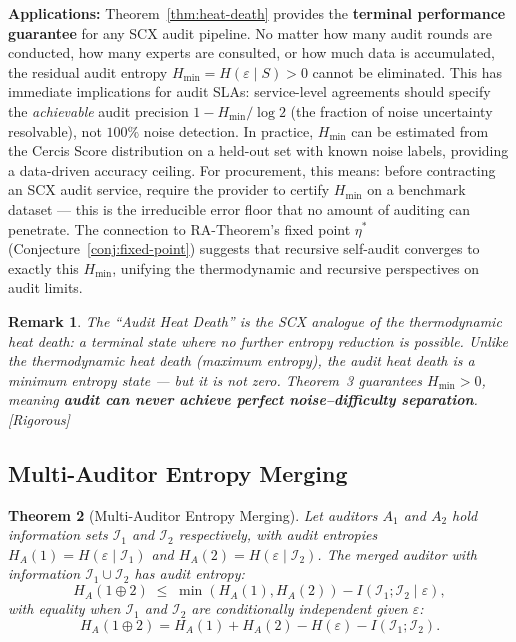 \documentclass[12pt,a4paper]{article}
\newtheorem{theorem}{Theorem}[section]
\newtheorem{remark}[theorem]{Remark}
\newcommand{\rigorous}{\textcolor{green!50!black}{\small\textsf{[Rigorous]}}}
\newcommand{\cI}{\mathcal{I}}
\begin{document}
\medskip\noindent
\textbf{Applications:}
Theorem~\ref{thm:heat-death} provides the \textbf{terminal performance
guarantee} for any SCX audit pipeline.  No matter how many audit rounds are
conducted, how many experts are consulted, or how much data is accumulated,
the residual audit entropy $H_{\min}=H(\varepsilon\mid S)>0$ cannot be
eliminated.  This has immediate implications for audit SLAs: service-level
agreements should specify the \emph{achievable} audit precision
$1-H_{\min}/\log 2$ (the fraction of noise uncertainty resolvable), not
$100\%$ noise detection.  In practice, $H_{\min}$ can be estimated from
the Cercis Score distribution on a held-out set with known noise labels,
providing a data-driven accuracy ceiling.  For procurement, this means:
before contracting an SCX audit service, require the provider to certify
$H_{\min}$ on a benchmark dataset — this is the irreducible error floor that
no amount of auditing can penetrate.  The connection to RA-Theorem's fixed
point $\eta^*$ (Conjecture~\ref{conj:fixed-point}) suggests that recursive
self-audit converges to exactly this $H_{\min}$, unifying the thermodynamic
and recursive perspectives on audit limits.

\begin{remark}
The ``Audit Heat Death'' is the SCX analogue of the thermodynamic heat death:
a terminal state where no further entropy reduction is possible.  Unlike the
thermodynamic heat death (maximum entropy), the audit heat death is a
\emph{minimum} entropy state — but it is not zero.  Theorem~3 guarantees
$H_{\min}>0$, meaning \textbf{audit can never achieve perfect noise--difficulty
separation}.  \rigorous
\end{remark}

\subsection{Multi-Auditor Entropy Merging}

\begin{theorem}[Multi-Auditor Entropy Merging]
\label{thm:merging}
Let auditors $A_1$ and $A_2$ hold information sets $\cI_1$ and $\cI_2$
respectively, with audit entropies $H_A(1)=H(\varepsilon\mid\cI_1)$ and
$H_A(2)=H(\varepsilon\mid\cI_2)$.  The merged auditor with information
$\cI_1\cup\cI_2$ has audit entropy:
\begin{equation}\label{eq:merging}
    H_A(1\oplus 2)
    \;\leq\; \min(H_A(1), H_A(2))
              - I(\cI_1; \cI_2 \mid \varepsilon),
\end{equation}
with equality when $\cI_1$ and $\cI_2$ are conditionally independent given
$\varepsilon$:
\begin{equation}\label{eq:merging-eq}
    H_A(1\oplus 2)
    = H_A(1) + H_A(2) - H(\varepsilon) - I(\cI_1;\cI_2).
\end{equation}
\end{theorem}
\end{document}
